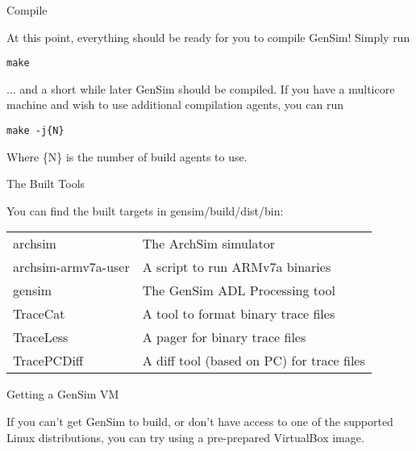 \begin{frame}[fragile]{Compile}

At this point, everything should be ready for you to compile GenSim!
Simply run

\begin{lstlisting}
make
\end{lstlisting}

... and a short while later GenSim should be compiled. If you have a 
multicore machine and wish to use additional compilation agents, you
can run

\begin{lstlisting}
make -j{N}
\end{lstlisting}

Where \{N\} is the number of build agents to use.

\end{frame}

\begin{frame}{The Built Tools}

You can find the built targets in gensim/build/dist/bin:
\bigskip

\begin{tabular}{ll}
archsim				& The ArchSim simulator \\
archsim-armv7a-user & A script to run ARMv7a binaries \\
gensim              & The GenSim ADL Processing tool \\
TraceCat            & A tool to format binary trace files \\
TraceLess           & A pager for binary trace files \\
TracePCDiff         & A 	diff tool (based on PC) for trace files \\
\end{tabular}

\end{frame}


\begin{frame}{Getting a GenSim VM}

If you can't get GenSim to build, or don't have access to one of the
supported Linux distributions, you can try using a pre-prepared 
VirtualBox image.


\end{frame}
